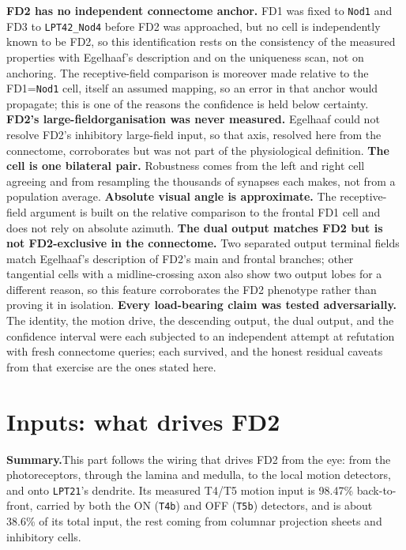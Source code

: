 \documentclass[11pt]{article}
\newcommand{\ttt}[1]{\texttt{#1}}
\begin{document}
\textbf{FD2 has no independent connectome anchor.} FD1 was fixed to \ttt{Nod1} and FD3 to \ttt{LPT42\_Nod4} before FD2 was approached, but no cell is independently known to be FD2, so this identification rests on the consistency of the measured properties with Egelhaaf's description and on the uniqueness scan, not on anchoring. The receptive-field comparison is moreover made relative to the FD1=\ttt{Nod1} cell, itself an assumed mapping, so an error in that anchor would propagate; this is one of the reasons the confidence is held below certainty. \textbf{FD2's large-fieldorganisation was never measured.} Egelhaaf could not resolve FD2's inhibitory large-field input, so that axis, resolved here from the connectome, corroborates but was not part of the physiological definition. \textbf{The cell is one bilateral pair.} Robustness comes from the left and right cell agreeing and from resampling the thousands of synapses each makes, not from a population average. \textbf{Absolute visual angle is approximate.} The receptive-field argument is built on the relative comparison to the frontal FD1 cell and does not rely on absolute azimuth. \textbf{The dual output matches FD2 but is not FD2-exclusive in the connectome.} Two separated output terminal fields match Egelhaaf's description of FD2's main and frontal branches; other tangential cells with a midline-crossing axon also show two output lobes for a different reason, so this feature corroborates the FD2 phenotype rather than proving it in isolation. \textbf{Every load-bearing claim was tested adversarially.} The identity, the motion drive, the descending output, the dual output, and the confidence interval were each subjected to an independent attempt at refutation with fresh connectome queries; each survived, and the honest residual caveats from that exercise are the ones stated here.

\clearpage

\part{Inputs: what drives FD2}

\textbf{Summary.}\quad This part follows the wiring that drives FD2 from the eye: from the photoreceptors, through the lamina and medulla, to the local motion detectors, and onto \ttt{LPT21}'s dendrite. Its measured T4/T5 motion input is 98.47\% back-to-front, carried by both the ON (\ttt{T4b}) and OFF (\ttt{T5b}) detectors, and is about 38.6\% of its total input, the rest coming from columnar projection sheets and inhibitory cells.
\end{document}
